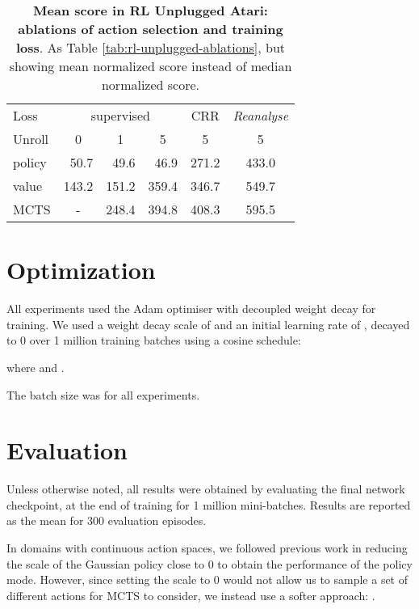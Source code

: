 \documentclass{article}
\newcommand{\reanalyse}{\emph{Reanalyse}}
\begin{document}
\begin{table}[t]
\begin{center}\begin{tabularx}{\columnwidth}{l|rrrcc}
\toprule
Loss &  \multicolumn{3}{c}{supervised} & CRR & \reanalyse{} \\
Unroll & \multicolumn{1}{c}{0} & \multicolumn{1}{c}{1}  & \multicolumn{1}{c}{5} & 5 & 5 \\
\midrule
policy & 50.7 & 49.6 & 46.9 & 271.2 & 433.0\\
value & 143.2 & 151.2 & 359.4 & 346.7 & 549.7\\
MCTS &  \multicolumn{1}{c}{-}  & 248.4 & 394.8 & 408.3 & 595.5\\
\bottomrule
\end{tabularx}
\end{center}
 \caption{
\label{tab:rl-unplugged-ablations-mean}
\textbf{Mean score in RL Unplugged Atari: ablations of action selection and training loss}. As Table \ref{tab:rl-unplugged-ablations}, but showing mean normalized score instead of median normalized score.
}
\end{table}


\section{Optimization}

All experiments used the Adam optimiser \cite{adam} with decoupled weight decay \cite{adam_weight_decay} for training. We used a weight decay scale of  and an initial learning rate of , decayed to 0 over 1 million training batches using a cosine schedule:



where  and .

The batch size was  for all experiments.

\section{Evaluation}

Unless otherwise noted, all results were obtained by evaluating the final network checkpoint, at the end of training for 1 million mini-batches. Results are reported as the mean for 300 evaluation episodes.



In domains with continuous action spaces, we followed previous work \cite{rl_unplugged} in reducing the scale of the Gaussian policy close to 0 to obtain the performance of the policy mode. However, since setting the scale to 0 would not allow us to sample a set of different actions for MCTS to consider, we instead use a softer approach: .
\end{document}

